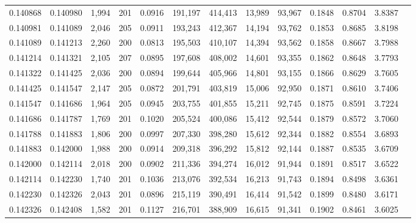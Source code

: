 \begin{tabular}{rrrrrrrrrrrrr}
0.140868 & 0.140980 & 1,994 & 201 &                                     0.0916 & 191,197 & 414,413 &  13,989 &  93,967 & 0.1848 & 0.8704 & 3.8387 \\
0.140981 & 0.141089 & 2,046 & 205 &                                     0.0911 & 193,243 & 412,367 &  14,194 &  93,762 & 0.1853 & 0.8685 & 3.8198 \\
0.141089 & 0.141213 & 2,260 & 200 &                                     0.0813 & 195,503 & 410,107 &  14,394 &  93,562 & 0.1858 & 0.8667 & 3.7988 \\
0.141214 & 0.141321 & 2,105 & 207 &                                     0.0895 & 197,608 & 408,002 &  14,601 &  93,355 & 0.1862 & 0.8648 & 3.7793 \\
0.141322 & 0.141425 & 2,036 & 200 &                                     0.0894 & 199,644 & 405,966 &  14,801 &  93,155 & 0.1866 & 0.8629 & 3.7605 \\
0.141425 & 0.141547 & 2,147 & 205 &                                     0.0872 & 201,791 & 403,819 &  15,006 &  92,950 & 0.1871 & 0.8610 & 3.7406 \\
0.141547 & 0.141686 & 1,964 & 205 &                                     0.0945 & 203,755 & 401,855 &  15,211 &  92,745 & 0.1875 & 0.8591 & 3.7224 \\
0.141686 & 0.141787 & 1,769 & 201 &                                     0.1020 & 205,524 & 400,086 &  15,412 &  92,544 & 0.1879 & 0.8572 & 3.7060 \\
0.141788 & 0.141883 & 1,806 & 200 &                                     0.0997 & 207,330 & 398,280 &  15,612 &  92,344 & 0.1882 & 0.8554 & 3.6893 \\
0.141883 & 0.142000 & 1,988 & 200 &                                     0.0914 & 209,318 & 396,292 &  15,812 &  92,144 & 0.1887 & 0.8535 & 3.6709 \\
0.142000 & 0.142114 & 2,018 & 200 &                                     0.0902 & 211,336 & 394,274 &  16,012 &  91,944 & 0.1891 & 0.8517 & 3.6522 \\
0.142114 & 0.142230 & 1,740 & 201 &                                     0.1036 & 213,076 & 392,534 &  16,213 &  91,743 & 0.1894 & 0.8498 & 3.6361 \\
0.142230 & 0.142326 & 2,043 & 201 &                                     0.0896 & 215,119 & 390,491 &  16,414 &  91,542 & 0.1899 & 0.8480 & 3.6171 \\
0.142326 & 0.142408 & 1,582 & 201 &                                     0.1127 & 216,701 & 388,909 &  16,615 &  91,341 & 0.1902 & 0.8461 & 3.6025 \\

\end{tabular}
